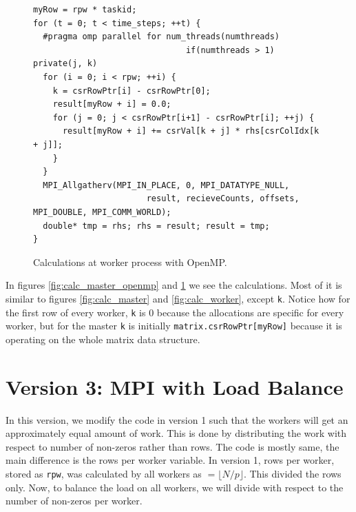 \documentclass[12pt,reqno]{amsart}
\newcommand{\code}[1]{\texttt{#1}}
\begin{document}
\begin{figure}[h]
\centering
\begin{lstlisting}
myRow = rpw * taskid;
for (t = 0; t < time_steps; ++t) {
  #pragma omp parallel for num_threads(numthreads)
                               if(numthreads > 1) private(j, k)
  for (i = 0; i < rpw; ++i) {
    k = csrRowPtr[i] - csrRowPtr[0];
    result[myRow + i] = 0.0;
    for (j = 0; j < csrRowPtr[i+1] - csrRowPtr[i]; ++j) {
      result[myRow + i] += csrVal[k + j] * rhs[csrColIdx[k + j]];
    }
  }
  MPI_Allgatherv(MPI_IN_PLACE, 0, MPI_DATATYPE_NULL, 
                       result, recieveCounts, offsets, MPI_DOUBLE, MPI_COMM_WORLD);
  double* tmp = rhs; rhs = result; result = tmp;
}	
\end{lstlisting}
\caption{Calculations at worker process with OpenMP.}
\label{fig:calc_worker_openmp}
\end{figure}

In figures \ref{fig:calc_master_openmp} and \ref{fig:calc_worker_openmp} we see the calculations. Most of it is similar to figures \ref{fig:calc_master} and \ref{fig:calc_worker}, except \code{k}. Notice how for the first row of every worker, \code{k} is 0 because the allocations are specific for every worker, but for the master \code{k} is initially \code{matrix.csrRowPtr[myRow]} because it is operating on the whole matrix data structure.

\section{Version 3: MPI with Load Balance}
In this version, we modify the code in version 1 such that the workers will get an approximately equal amount of work. This is done by distributing the work with respect to number of non-zeros rather than rows. The code is mostly same, the main difference is the rows per worker variable. In version 1, rows per worker, stored as \code{rpw}, was calculated by all workers as $=\lfloor N/p\rfloor$. This divided the rows only. Now, to balance the load on all workers, we will divide with respect to the number of non-zeros per worker. 
\end{document}
